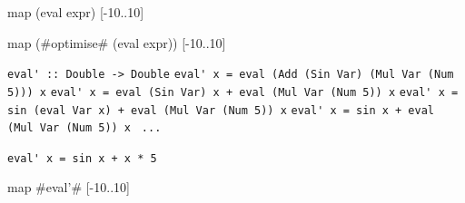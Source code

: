 \documentclass{beamer}
\begin{document}
\begin{frame}[fragile]

\begin{codeEx}
map (eval expr) [-10..10]
\end{codeEx}

\end{frame}

\begin{frame}[fragile] 
\begin{codeExDiff}
map (#optimise# (eval expr)) [-10..10]
\end{codeExDiff}

\pause

\verb|eval' :: Double -> Double|
\pause
\verb|eval' x = eval (Add (Sin Var) (Mul Var (Num 5))) x|
\pause
\verb|eval' x = eval (Sin Var) x + eval (Mul Var (Num 5)) x|
\pause
\verb|eval' x = sin (eval Var x) + eval (Mul Var (Num 5)) x|
\pause
\verb|eval' x = sin x + eval (Mul Var (Num 5)) x |
\pause
\verb|...                          |

\verb|eval' x = sin x + x * 5|

\pause

\begin{codeExDiff}
map #eval'# [-10..10]
\end{codeExDiff}
\end{frame}



\end{document}
